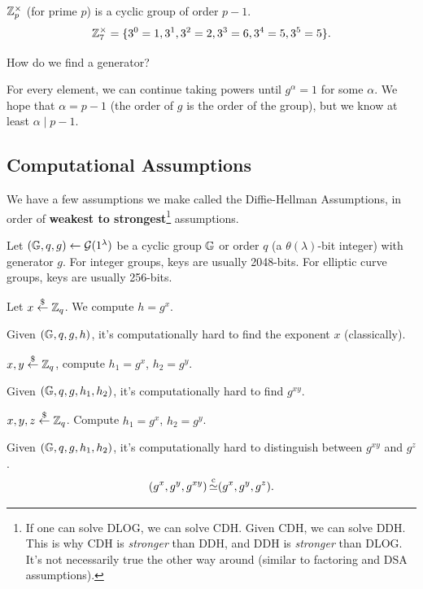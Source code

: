 \begin{example*}
    $\mathbb Z_p^\times$ (for prime $p$) is a cyclic group of order $p-1$.
    \[\mathbb Z_7^\times = \{3^0 = 1, 3^1, 3^2=2, 3^3 = 6, 3^4 = 5, 3^5 = 5\}.\]
\end{example*}
\begin{ques*}
    How do we find a generator?
\end{ques*}
For every element, we can continue taking powers until $g^\alpha = 1$ for some $\alpha$. We hope that $\alpha = p-1$ (the order of $g$ is the order of the group), but we know at least $\alpha \mid p-1$.

\subsection{Computational Assumptions}

We have a few assumptions we make called the Diffie-Hellman Assumptions, in order of \textbf{weakest to strongest}\footnote{If one can solve DLOG, we can solve CDH. Given CDH, we can solve DDH. This is why CDH is \emph{stronger} than DDH, and DDH is \emph{stronger} than DLOG. It's not necessarily true the other way around (similar to factoring and DSA assumptions). } assumptions.

Let $(\mathbb G, q, g)\leftarrow \mathcal{G}(1^\lambda)$ be a cyclic group $\mathbb G$ or order $q$ (a $\theta(\lambda)$-bit integer) with generator $g$. For integer groups, keys are usually 2048-bits. For elliptic curve groups, keys are usually 256-bits.

\begin{definition}
    Let $x\overset{\$}{\leftarrow} \mathbb Z_q$. We compute $h = g^x$.

    Given $(\mathbb G, q, g, h)$, it's computationally hard to find the exponent $x$ (classically).
\end{definition}

\begin{definition}
    $x, y\overset{\$}{\leftarrow} \mathbb Z_q$, compute $h_1 = g^x$, $h_2 = g^y$.

    Given $(\mathbb G, q, g, h_1, h_2)$, it's computationally hard to find $g^{xy}$.
\end{definition}

\begin{definition}
    $x, y, z\overset{\$}{\leftarrow} \mathbb Z_q$. Compute $h_1 = g^x$, $h_2 = g^y$.

    Given $(\mathbb G, q, g, h_1, h_2)$, it's computationally hard to distinguish between $g^{xy}$ and $g^z$.
    \[(g^x, g^y, g^{xy}) \operatorname{\overset{c}{\simeq}} (g^x, g^y, g^z).\]
\end{definition}

